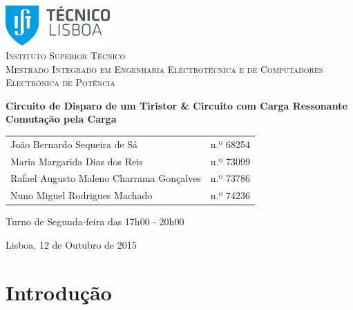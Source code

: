 \documentclass[a4paper,11pt]{article}
\numberwithin{equation}{section}
\begin{document}
\begin{titlepage}
\begin{center}

\hfill \break
\hfill \break

\includegraphics[width=0.3\textwidth]{img/logo}~\\[1cm] 

\textsc{\LARGE Instituto Superior Técnico}\\[0.25cm]
\textsc{\Large Mestrado Integrado em Engenharia Electrotécnica e de Computadores}\\[1.8cm]
\textsc{\huge Electrónica de Potência}\\[0.25cm]

\vspace{6mm}

{\huge \bfseries Circuito de Disparo de um Tiristor \linebreak \& \linebreak Circuito com Carga Ressonante \linebreak Comutação pela Carga  \\[1cm]}

\begin{tabular}{ l l }
	João Bernardo Sequeira de Sá & \hspace{2mm} n.º 68254 \\
	Maria Margarida Dias dos Reis & \hspace{2mm} n.º 73099 \\
	Rafael Augusto Maleno Charrama Gonçalves & \hspace{2mm} n.º 73786 \\
	Nuno Miguel Rodrigues Machado & \hspace{2mm} n.º 74236
\end{tabular}

\vspace{7mm}

Turno de Segunda-feira das 17h00 - 20h00

\vfill

{\large Lisboa, 12 de Outubro de 2015} 
	
\end{center}
\end{titlepage}
	
\tableofcontents
\pagebreak

\section{Introdução}
\end{document}
